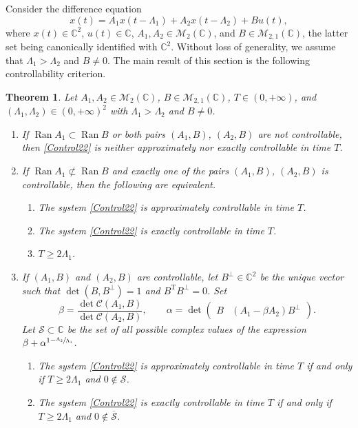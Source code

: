 \documentclass[JEP,XML,SOM,Unicode]{cedram}
\theoremstyle{plain}
\newtheorem{theo}{Theorem}[section]
\theoremstyle{definition}
\DeclareMathOperator{\range}{Ran}
\newcommand{\transp}{{\scriptscriptstyle\mathrm{T}}}
\begin{document}
Consider the difference equation
\begin{equation}
\label{Control22}
x(t) = A_1 x(t - \Lambda_1) + A_2 x(t - \Lambda_2) + B u(t),
\end{equation}
where $x(t) \in \mathbb C^2$, $u(t) \in \mathbb C$, $A_1, A_2 \in \mathcal M_2(\mathbb C)$, and $B \in \mathcal M_{2, 1}(\mathbb C)$, the latter set being canonically identified with $\mathbb C^2$. Without loss of generality, we assume that $\Lambda_1 > \Lambda_2$ and $B \neq 0$. The main result of this section is the following controllability criterion.

\begin{theo}
\label{MainTheo22}
Let $A_1, A_2 \in \mathcal M_2(\mathbb C)$, $B \in \mathcal M_{2, 1}(\mathbb C)$, $T \in (0, +\infty)$, and $(\Lambda_1, \Lambda_2) \in (0, +\infty)^2$ with $\Lambda_1 > \Lambda_2$ and $B \neq 0$.
\begin{enumerate}
\item\label{MainTheoA1BNonContr} If $\range A_1 \subset \range B$ or both pairs $(A_1, B)$, $(A_2, B)$ are not controllable, then \eqref{Control22} is neither approximately nor exactly controllable in time $T$.
\item\label{MainTheoA2BNonContr} If $\range A_1 \not\subset \range B$ and exactly one of the pairs $(A_1, B)$, $(A_2, B)$ is controllable, then the following are equivalent.
\begin{enumerate}
\item The system \eqref{Control22} is approximately controllable in time $T$.
\item The system \eqref{Control22} is exactly controllable in time $T$.
\item $T \geq 2 \Lambda_{1}$.
\end{enumerate}
\item\label{MainTheoA1A2Contr} If $(A_1, B)$ and $(A_2, B)$ are controllable, let $B^\perp \in \mathbb C^2$ be the unique vector such that $\det(B, B^\perp)  = 1$ and $B^\transp B^\perp = 0$. Set
\begin{equation}
\label{DefAlphaBeta}
\beta = \frac{\det \mathcal C(A_1, B)}{\det \mathcal C(A_2, B)}, \qquad \alpha = \det \begin{pmatrix}B & (A_1 - \beta A_2) B^\perp\end{pmatrix}.
\end{equation}
Let $\mathcal S \subset \mathbb C$ be the set of all possible complex values of the expression $\beta + \alpha^{1 - \sfrac{\Lambda_{2}}{\Lambda_{1}}}$.
\begin{enumerate}
\item\label{MainTheoApprox} The system \eqref{Control22} is approximately controllable in time $T$ if and only if $T \geq 2 \Lambda_{1}$ and $0 \notin \mathcal S$.
\item\label{MainTheoExact} The system \eqref{Control22} is exactly controllable in time $T$ if and only if $T \geq 2 \Lambda_{1}$ and $0 \notin \overline{\mathcal S}$.
\end{enumerate}
\end{enumerate}
\end{theo}
\end{document}
